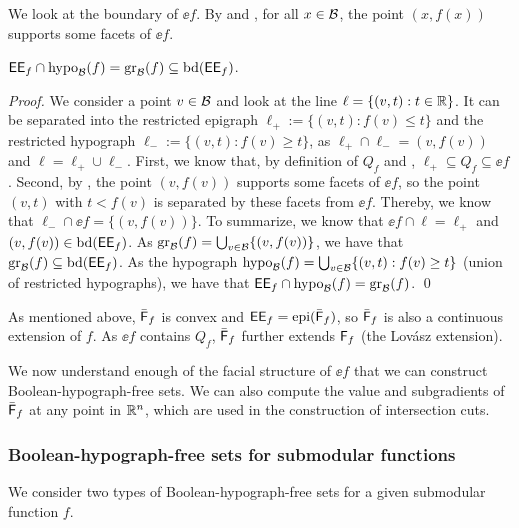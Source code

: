  We look at the boundary of $\ee{f}$. By  and , for all $x \in \mathcal B$, the point $(x,f(x))$  supports  some facets of $\ee{f}$.

\begin{theorem}
\label{thm.bdeef}
$\mathsf{EE}_{f}  \cap \operatorname{hypo}_{\mathcal B}(f) = \operatorname{gr}_{\mathcal B}(f) \subseteq \operatorname{bd}(\mathsf{EE}_{f} )$.
\end{theorem}
\begin{proof}
We consider a point $v \in \mathcal B$ and look at the line $ \ell = \{(v,t): t \in \mathbb R\}$. It can be separated into the restricted epigraph $\ell_+:=\{(v,t):f(v) \le t\}$ and  the restricted hypograph $\ell_-:=\{(v,t):f(v) \ge t\}$, as $\ell_+ \cap \ell_- = (v, f(v))$ and $ \ell = \ell_+ \cup \ell_-$.
First,  we know that, by  definition of $Q_f$ and ,   $\ell_+ \subseteq Q_f \subseteq \ee{f}$. Second, by ,  the point $(v, f(v))$ supports some facets of $\ee{f}$, so the point $(v,t)$ with $t < f(v)$ is separated by these facets from  $\ee{f}$. Thereby, we know that $\ell_- \cap \ee{f} = \{(v, f(v))\}$. To summarize, we know that $\ee{f} \cap \ell = \ell_+$ and $(v, f(v)) \in \operatorname{bd}(\mathsf{EE}_{f} )$. As $\operatorname{gr}_{\mathcal B}(f) = \bigcup_{v \in \mathcal B} \{(v,f(v))\}$, we have that  $ \operatorname{gr}_{\mathcal B}(f)  \subseteq \operatorname{bd}(\mathsf{EE}_{f} )$. As the hypograph $\operatorname{hypo}_{\mathcal B}(f) = \bigcup_{v \in \mathcal B} \{(v,t):f(v) \ge t\} $ (union of restricted hypographs), we have that $\mathsf{EE}_{f}  \cap \operatorname{hypo}_{\mathcal B}(f) = \operatorname{gr}_{\mathcal B}(f)$. \qed
\end{proof}

 As mentioned above, $\bar{\mathsf F}_{f}$ is convex and $\mathsf{EE}_{f}  =\operatorname{epi}(\bar{\mathsf F}_{f}) $, so $\bar{\mathsf F}_{f}$ is also a continuous extension of $f$. As $\ee{f}$ contains $Q_f$, $\bar{\mathsf F}_{f}$ further extends ${\mathsf F}_f$ (the Lovász extension).

 We now understand enough of the facial structure of $\ee{f}$  that we can construct Boolean-hypograph-free sets.
 We can also compute the value and subgradients of $\bar{\mathsf F}_{f}$ at any point in $\mathbb R^n$, which are used in the construction of intersection cuts.


\subsubsection{Boolean-hypograph-free sets for submodular functions}
\label{sec.maxsub}
We consider two types of Boolean-hypograph-free sets for a given submodular function $f$.
 
